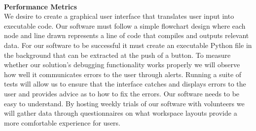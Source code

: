 \documentclass[a4paper,10pt]{IEEETran} \usepackage[margin=1.0in]{geometry} \usepackage{pdfpages} \usepackage{graphicx}
\begin{document}
	\begin{minipage}{\textwidth}
		\\
		\label{fig:fig1}
	\end{minipage}
	\noindent \textbf{Performance Metrics}\\
	\indent We desire to create a graphical user interface that translates user input into executable code. 
	Our software must follow a simple flowchart design where each node and line drawn represents a line of code that compiles and outputs relevant data.
	For our software to be successful it must create an executable Python file in the background that can be extracted at the push of a button. 
	To measure whether our solution's debugging functionality works properly we will observe how well it communicates errors to the user through alerts.
	 Running a suite of tests will allow us to ensure that the interface catches and displays errors to the user and provides advice as to how to fix the errors.
	 Our software needs to be easy to understand.
	 By hosting weekly trials of our software with volunteers we will gather data through questionnaires on what workspace layouts provide a more comfortable experience for users.
	 
	 
	 
\end{document}

